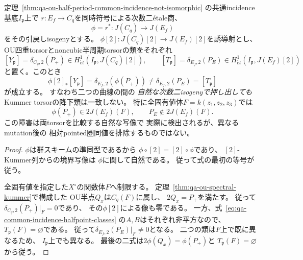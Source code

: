 \begin{corollary}[双対二同種写像でもKummer類は一致しない]
\label{cor:qa-ou-half-isogeny-kummer-classes-distinct}
定理~\ref{thm:qa-ou-half-period-common-incidence-not-isomorphic}
の共通incidence基底$I_{\mathfrak p}$上で
$r:E_f\to C_q$を同時符号による次数二\'{e}tale商、
\[
 \phi=r^*:J(C_q)\longrightarrow J(E_f)
\]
をその引戻しisogenyとする。
$\phi[2]:J(C_q)[2]\to J(E_f)[2]$を誘導射とし、
OU四重torsorとnoncubic半周期torsorの類をそれぞれ
\[
 [Y_{\mathfrak p}]=\delta_{C_q,2}(P_+)
 \in H^1_{\acute et}(I_{\mathfrak p},J(C_q)[2]),
 \qquad
 [T_{\mathfrak p}]=\delta_{E_f,2}(P_E)
 \in H^1_{\acute et}(I_{\mathfrak p},J(E_f)[2])
\]
と置く。このとき
\begin{equation}
 \boxed{
 \phi[2]_*[Y_{\mathfrak p}]
   =\delta_{E_f,2}(\phi(P_+))
   \ne\delta_{E_f,2}(P_E)
   =[T_{\mathfrak p}]
 }
 \label{eq:qa-ou-half-isogeny-kummer-nonmatching}
\end{equation}
が成立する。
すなわち二つの曲線の間の
\emph{自然な次数二isogenyで押し出しても}
Kummer torsorの降下類は一致しない。
特に全固有値体$F=k(z_1,z_2,z_3)$では
\[
 \phi(P_+)\in2J(E_f)(F),
 \qquad
 P_E\notin2J(E_f)(F).
\]
この障害は両torsorを比較する自然な写像で
実際に検出されるが、異なるmutation後の
相対pointed圏同値を排除するものではない。
\end{corollary}
\begin{proof}
$\phi$は群スキームの準同型であるから
$\phi\circ[2]=[2]\circ\phi$であり、
$[2]$-Kummer列からの境界写像は
$\phi$に関して自然である。
従って式の最初の等号が従う。

全固有値を指定した$X^\circ$の関数体$F$へ制限する。
定理~\ref{thm:qa-ou-spectral-kummer}で構成した
OU半点$Q_x$は$C_q(F)$に属し、
$2Q_x=P_+$を満たす。
従って$\delta_{C_q,2}(P_+)|_F=0$であり、
その$\phi[2]$による像も零である。
一方、式~\eqref{eq:qa-common-incidence-halfpoint-classes}
の$A,B$はそれぞれ非平方なので、
$T_{\mathfrak p}(F)=\varnothing$である。
従って$\delta_{E_f,2}(P_E)|_F\ne0$となる。
二つの類は$F$上で既に異なるため、
$I_{\mathfrak p}$上でも異なる。
最後の二式は$2\phi(Q_x)=\phi(P_+)$と
$T_{\mathfrak p}(F)=\varnothing$から従う。
\end{proof}

